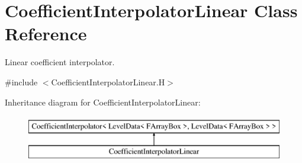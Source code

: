 \hypertarget{class_coefficient_interpolator_linear}{\section{Coefficient\-Interpolator\-Linear Class Reference}
\label{class_coefficient_interpolator_linear}
}


Linear coefficient interpolator.  




{\ttfamily \#include $<$Coefficient\-Interpolator\-Linear.\-H$>$}

Inheritance diagram for Coefficient\-Interpolator\-Linear\-:\begin{figure}[H]
\begin{center}
\leavevmode
\includegraphics[height=2.000000cm]{class_coefficient_interpolator_linear}
\end{center}
\end{figure}
